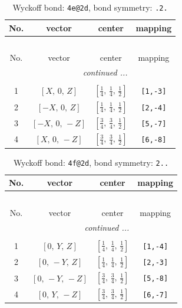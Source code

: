 \documentclass[fleqn,8pt]{jsarticle}
\begin{document}
\renewcommand{\arraystretch}{1.2}
\begin{longtable}{cccc}
\caption{Wyckoff bond: {\tt 4e@2d}, bond symmetry: {\tt .2.}}
 \\
 \hline \hline
No. & vector & center & mapping \\ \hline \endfirsthead

\multicolumn{3}{l}{\tablename\ \thetable{}} \\
 \hline \hline
No. & vector & center & mapping \\ \hline \endhead

 \hline \hline
\multicolumn{3}{r}{\footnotesize\it continued ...} \\ \endfoot

 \hline \hline
\multicolumn{3}{r}{} \\ \endlastfoot

1 & $\left[ X,\, 0,\, Z \right]$ & $\left[ \frac{1}{4},\, \frac{1}{4},\, \frac{1}{2} \right]$ & {\tt [1,-3]} \\ \hline
2 & $\left[ - X,\, 0,\, Z \right]$ & $\left[ \frac{1}{4},\, \frac{1}{4},\, \frac{1}{2} \right]$ & {\tt [2,-4]} \\ \hline
3 & $\left[ - X,\, 0,\, - Z \right]$ & $\left[ \frac{3}{4},\, \frac{3}{4},\, \frac{1}{2} \right]$ & {\tt [5,-7]} \\ \hline
4 & $\left[ X,\, 0,\, - Z \right]$ & $\left[ \frac{3}{4},\, \frac{3}{4},\, \frac{1}{2} \right]$ & {\tt [6,-8]} \\
\end{longtable}
\renewcommand{\arraystretch}{1.2}
\begin{longtable}{cccc}
\caption{Wyckoff bond: {\tt 4f@2d}, bond symmetry: {\tt 2..}}
 \\
 \hline \hline
No. & vector & center & mapping \\ \hline \endfirsthead

\multicolumn{3}{l}{\tablename\ \thetable{}} \\
 \hline \hline
No. & vector & center & mapping \\ \hline \endhead

 \hline \hline
\multicolumn{3}{r}{\footnotesize\it continued ...} \\ \endfoot

 \hline \hline
\multicolumn{3}{r}{} \\ \endlastfoot

1 & $\left[ 0,\, Y,\, Z \right]$ & $\left[ \frac{1}{4},\, \frac{1}{4},\, \frac{1}{2} \right]$ & {\tt [1,-4]} \\ \hline
2 & $\left[ 0,\, - Y,\, Z \right]$ & $\left[ \frac{1}{4},\, \frac{1}{4},\, \frac{1}{2} \right]$ & {\tt [2,-3]} \\ \hline
3 & $\left[ 0,\, - Y,\, - Z \right]$ & $\left[ \frac{3}{4},\, \frac{3}{4},\, \frac{1}{2} \right]$ & {\tt [5,-8]} \\ \hline
4 & $\left[ 0,\, Y,\, - Z \right]$ & $\left[ \frac{3}{4},\, \frac{3}{4},\, \frac{1}{2} \right]$ & {\tt [6,-7]} \\
\end{longtable}
\end{document}

